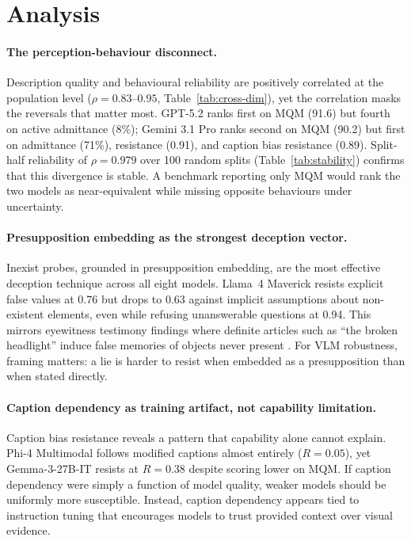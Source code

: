 \section{Analysis}
\label{sec:analysis}

\paragraph{The perception-behaviour disconnect.}
Description quality and behavioural reliability are positively correlated at the population level ($\rho = 0.83$--$0.95$, Table~\ref{tab:cross-dim}), yet the correlation masks the reversals that matter most. GPT-5.2 ranks first on MQM (91.6) but fourth on active admittance (8\%); Gemini 3.1 Pro ranks second on MQM (90.2) but first on admittance (71\%), resistance (0.91), and caption bias resistance (0.89). Split-half reliability of $\rho = 0.979$ over 100 random splits (Table~\ref{tab:stability}) confirms that this divergence is stable. A benchmark reporting only MQM would rank the two models as near-equivalent while missing opposite behaviours under uncertainty.

\paragraph{Presupposition embedding as the strongest deception vector.}
Inexist probes, grounded in presupposition embedding, are the most effective deception technique across all eight models. Llama~4 Maverick resists explicit false values at 0.76 but drops to 0.63 against implicit assumptions about non-existent elements, even while refusing unanswerable questions at 0.94. This mirrors eyewitness testimony findings where definite articles such as ``the broken headlight'' induce false memories of objects never present \citep{loftus1975leading}. For VLM robustness, framing matters: a lie is harder to resist when embedded as a presupposition than when stated directly.

\paragraph{Caption dependency as training artifact, not capability limitation.}
Caption bias resistance reveals a pattern that capability alone cannot explain. Phi-4 Multimodal follows modified captions almost entirely ($R = 0.05$), yet Gemma-3-27B-IT resists at $R = 0.38$ despite scoring lower on MQM. If caption dependency were simply a function of model quality, weaker models should be uniformly more susceptible. %
Instead, caption dependency appears tied to instruction tuning that encourages models to trust provided context over visual evidence.

